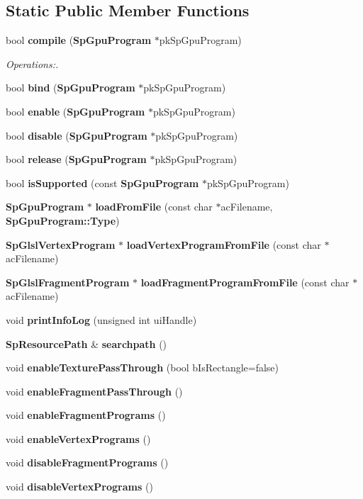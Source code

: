 \subsection*{Static Public Member Functions}
\begin{CompactItemize}
\item 
bool {\bf compile} ({\bf Sp\-Gpu\-Program} $\ast$pk\-Sp\-Gpu\-Program)
\begin{CompactList}\small\item\em Operations:. \item\end{CompactList}\item 
bool {\bf bind} ({\bf Sp\-Gpu\-Program} $\ast$pk\-Sp\-Gpu\-Program)
\item 
bool {\bf enable} ({\bf Sp\-Gpu\-Program} $\ast$pk\-Sp\-Gpu\-Program)
\item 
bool {\bf disable} ({\bf Sp\-Gpu\-Program} $\ast$pk\-Sp\-Gpu\-Program)
\item 
bool {\bf release} ({\bf Sp\-Gpu\-Program} $\ast$pk\-Sp\-Gpu\-Program)
\item 
bool {\bf is\-Supported} (const {\bf Sp\-Gpu\-Program} $\ast$pk\-Sp\-Gpu\-Program)
\item 
{\bf Sp\-Gpu\-Program} $\ast$ {\bf load\-From\-File} (const char $\ast$ac\-Filename, {\bf Sp\-Gpu\-Program::Type})
\item 
{\bf Sp\-Glsl\-Vertex\-Program} $\ast$ {\bf load\-Vertex\-Program\-From\-File} (const char $\ast$ac\-Filename)
\item 
{\bf Sp\-Glsl\-Fragment\-Program} $\ast$ {\bf load\-Fragment\-Program\-From\-File} (const char $\ast$ac\-Filename)
\item 
void {\bf print\-Info\-Log} (unsigned int ui\-Handle)
\item 
{\bf Sp\-Resource\-Path} \& {\bf searchpath} ()
\item 
void {\bf enable\-Texture\-Pass\-Through} (bool b\-Is\-Rectangle=false)
\item 
void {\bf enable\-Fragment\-Pass\-Through} ()
\item 
void {\bf enable\-Fragment\-Programs} ()
\item 
void {\bf enable\-Vertex\-Programs} ()
\item 
void {\bf disable\-Fragment\-Programs} ()
\item 
void {\bf disable\-Vertex\-Programs} ()
\end{CompactItemize}
